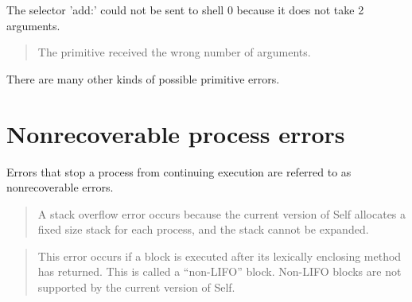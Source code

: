 \documentclass[letterpaper,10pt,english]{sphinxmanual}
\begin{document}
\begin{sphinxVerbatim}[commandchars=\\\{\}]
The selector ’add:’ could not be sent to shell \PYGZlt{}0\PYGZgt{} because it does not take 2 arguments.
\end{sphinxVerbatim}
\begin{quote}

The primitive  received the wrong number of arguments.
\end{quote}

There are many other kinds of possible primitive errors.


\section{Nonrecoverable process errors}
\label{\detokenize{vmref:nonrecoverable-process-errors}}
Errors that stop a process from continuing execution are referred to as nonrecoverable errors.

\begin{sphinxVerbatim}[commandchars=\\\{\}]
     
          
\end{sphinxVerbatim}
\begin{quote}

A stack overflow error occurs because the current version of Self allocates a fixed size stack for each process, and the stack cannot be expanded.
\end{quote}

\begin{sphinxVerbatim}[commandchars=\\\{\}]
           
     
\end{sphinxVerbatim}
\begin{quote}

This error occurs if a block is executed after its lexically enclosing method has returned.
This is called a “non-LIFO” block. Non-LIFO blocks are not supported by
the current version of Self.
\end{quote}
\end{document}
